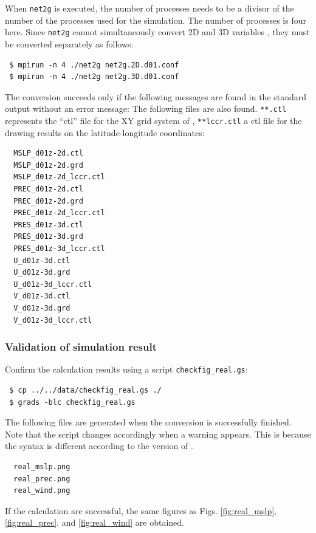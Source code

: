 When \verb|net2g| is executed, the number of processes needs to be a divisor of the number of the processes used for the simulation. 
The number of processes is four here. Since \verb|net2g| cannot simultaneously convert 2D and 3D variables , they must be converted separately as follows:
\begin{verbatim}
 $ mpirun -n 4 ./net2g net2g.2D.d01.conf
 $ mpirun -n 4 ./net2g net2g.3D.d01.conf
\end{verbatim}
The conversion succeeds only if the following messages are found  in the standard output without an error message:
The following files are also found. \verb|**.ctl| represents the ``ctl'' file for the XY grid system of \scalerm, \verb|**lccr.ctl| a ctl file for the drawing results on the latitude-longitude coordinates:
\begin{verbatim}
  MSLP_d01z-2d.ctl
  MSLP_d01z-2d.grd
  MSLP_d01z-2d_lccr.ctl
  PREC_d01z-2d.ctl
  PREC_d01z-2d.grd
  PREC_d01z-2d_lccr.ctl
  PRES_d01z-3d.ctl
  PRES_d01z-3d.grd
  PRES_d01z-3d_lccr.ctl
  U_d01z-3d.ctl
  U_d01z-3d.grd
  U_d01z-3d_lccr.ctl
  V_d01z-3d.ctl
  V_d01z-3d.grd
  V_d01z-3d_lccr.ctl
\end{verbatim}


\subsubsection{Validation of simulation result}
Confirm the calculation results using a \grads script \verb|checkfig_real.gs|: 
\begin{verbatim}
 $ cp ../../data/checkfig_real.gs ./
 $ grads -blc checkfig_real.gs
\end{verbatim}
The following files are generated when the conversion is successfully finished. Note that the script changes accordingly when a warning appears. This is because the syntax is different according to the version of \grads.
\begin{verbatim}
  real_mslp.png
  real_prec.png
  real_wind.png
\end{verbatim}
If the calculation are successful, the same figures as Figs. \ref{fig:real_mslp}, \ref{fig:real_prec}, and \ref{fig:real_wind}  are obtained.

